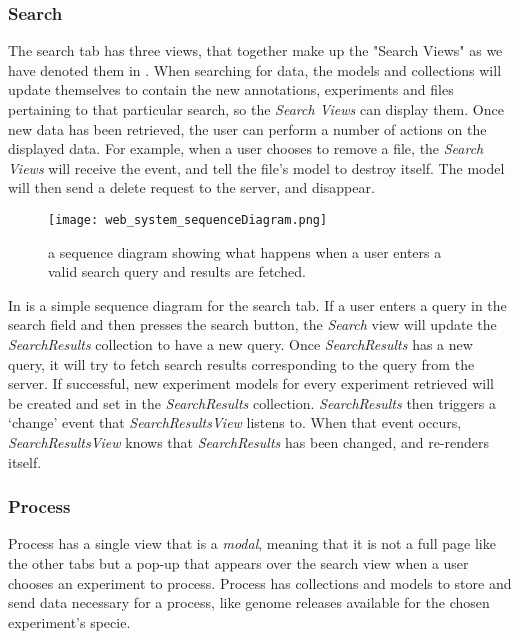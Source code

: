 \label{sec:web_search}
\subsubsection{Search}
The search tab has three views, that together make up the "Search Views" as we have denoted them in . When searching for data, the models and collections will update themselves to contain the new annotations, experiments and files pertaining to that particular search, so the \textit{Search Views} can display them. Once new data has been retrieved, the user can perform a number of actions on the displayed data. For example, when a user chooses to remove a file, the \textit{Search Views} will receive the event, and tell the file's model to destroy itself. The model will then send a delete request to the server, and disappear.

 
\begin{figure}[h]
\centering
\texttt{[image: web\_system\_sequenceDiagram.png]}
\caption{\label{fig:web_system_sequenceDiagram}a sequence diagram showing what happens when a user enters a valid search query and results are fetched.}
\end{figure}

In  is a simple sequence diagram for the search tab. If a user enters a query in the search field and then presses the search button, the \textit{Search} view will update the \textit{SearchResults} collection to have a new query. Once \textit{SearchResults} has a new query, it will try to fetch search results corresponding to the query from the server. If successful, new experiment models for every experiment retrieved will be created and set in the \textit{SearchResults} collection. \textit{SearchResults} then triggers a ‘change’ event that \textit{SearchResultsView} listens to. When that event occurs, \textit{SearchResultsView} knows that \textit{SearchResults} has been changed, and re-renders itself.

\subsubsection{Process}
Process has a single view that is a \textit{modal}, meaning that it is not a full page like the other tabs but a pop-up that appears over the search view when a user chooses an experiment to process. Process has collections and models to store and send data necessary for a process, like genome releases available for the chosen experiment's specie.   


